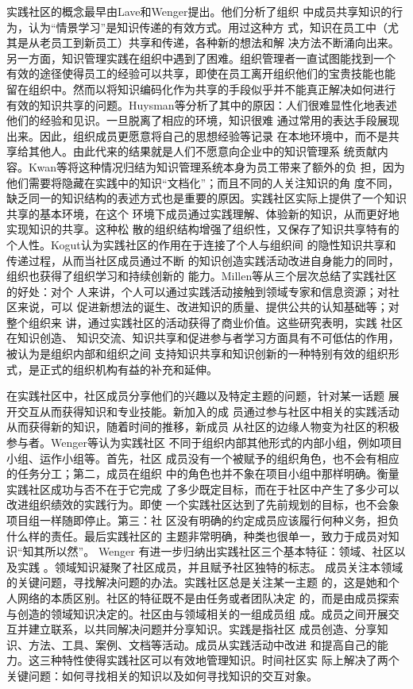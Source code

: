 \documentclass[12pt,a4paper]{ctexart}
\begin{document}
实践社区的概念最早由Lave和Wenger提出\cite{lave1991sll}。他们分析了组织
中成员共享知识的行为，认为“情景学习”是知识传递的有效方式。用过这种方
式，知识在员工中（尤其是从老员工到新员工）共享和传递，各种新的想法和解
决方法不断涌向出来。另一方面，知识管理实践在组织中遇到了困难。组织管理者一直试图能找到一个
有效的途径使得员工的经验可以共享，即使在员工离开组织他们的宝贵技能也能
留在组织中。然而以将知识编码化作为共享的手段似乎并不能真正解决如何进行
有效的知识共享的问题。Huysman等分析了其中的原因：人们很难显性化地表述
他们的经验和见识\cite{huysman2002ksp}。一旦脱离了相应的环境，知识很难
通过常用的表达手段展现出来。因此，组织成员更愿意将自己的思想经验等记录
在本地环境中，而不是共享给其他人。由此代来的结果就是人们不愿意向企业中的知识管理系
统贡献内容。Kwan等将这种情况归结为知识管理系统本身为员工带来了额外的负
担，因为他们需要将隐藏在实践中的知识“文档化”；而且不同的人关注知识的角
度不同，缺乏同一的知识结构的表述方式也是重要的原因\cite{MillieKwan2003}。实践社区实际上提供了一个知识共享的基本环境，在这个
环境下成员通过实践理解、体验新的知识，从而更好地实现知识的共享。这种松
散的组织结构增强了组织性，又保存了知识共享特有的个人性。Kogut认为实践社区的作用在于连接了个人与组织间
的隐性知识共享和传递过程\cite{443473219920801}，从而当社区成员通过不断
的知识创造实践活动改进自身能力的同时，组织也获得了组织学习和持续创新的
能力\cite{wenger1999cpl}。Millen等从三个层次总结了实践社区的好处：对个
人来讲，个人可以通过实践活动接触到领域专家和信息资源；对社区来说，可以
促进新想法的诞生、改进知识的质量、提供公共的认知基础等；对整个组织来
讲，通过实践社区的活动获得了商业价值\cite{millen2002uba}。这些研究表明，实践
社区在知识创造、
知识交流、知识共享和促进参与者学习方面具有不可低估的作用，被认为是组织内部和组织之间
支持知识共享和知识创新的一种特别有效的组织形式，是正式的组织机构有益的补充和延伸。



在实践社区中，社区成员分享他们的兴趣以及特定主题的问题，针对某一话题
展开交互从而获得知识和专业技能\cite{Wenger2002}。新加入的成
员通过参与社区中相关的实践活动从而获得新的知识，随着时间的推移，新成员
从社区的边缘人物变为社区的积极参与者。Wenger等认为实践社区
不同于组织内部其他形式的内部小组，例如项目小组、运作小组等。首先，社区
成员没有一个被赋予的组织角色，也不会有相应的任务分工；第二，成员在组织
中的角色也并不象在项目小组中那样明确。衡量实践社区成功与否不在于它完成
了多少既定目标，而在于社区中产生了多少可以改进组织绩效的实践行为。即使
一个实践社区达到了先前规划的目标，也不会象项目组一样随即停止。第三：社
区没有明确的约定成员应该履行何种义务，担负什么样的责任。最后实践社区的
主题非常明确，种类也很单一，致力于成员对知识“知其所以然”。
Wenger 有进一步归纳出实践社区三个基本特征：领域、社区以及实践
\cite{wenger2004kmd}。领域知识凝聚了社区成员，并且赋予社区独特的标志。
成员关注本领域的关键问题，寻找解决问题的办法。实践社区总是关注某一主题
的，这是她和个人网络的本质区别。社区的特征既不是由任务或者团队决定
的，而是由成员探索与创造的领域知识决定的。社区由与领域相关的一组成员组
成。成员之间开展交互并建立联系，以共同解决问题并分享知识。实践是指社区
成员创造、分享知识、方法、工具、案例、文档等活动。成员从实践活动中改进
和提高自己的能力。这三种特性使得实践社区可以有效地管理知识。时间社区实
际上解决了两个关键问题：如何寻找相关的知识以及如何寻找知识的交互对象\cite{Yang2008}。
\end{document}
